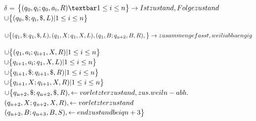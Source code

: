\documentclass[10pt,a4paper]{scrartcl}
\begin{document}
{\begin{enumerate}
$\delta$ =
$\big\{(q\textsubscript{0}, q\textsubscript{i}; q\textsubscript{0}, a\textsubscript{i}, R) \textbar 1 \le i \le n    \big\}         \rightarrow Istzustand, Folgezustand$ \\
$\cup \big\{(q\textsubscript{0}, \$; q\textsubscript{i}, \$, L) | 1 \le i \le n    \big\} $

$\cup \big\{(q\textsubscript{1}, \$; q\textsubscript{1}, \$, L), (q\textsubscript{1}, X; q\textsubscript{1}, X, L), (q\textsubscript{1}, B; q\textsubscript{n+2}, B, R),  \big\} \rightarrow zusammengefasst, weil i abhaengig$

$\cup \big\{(q\textsubscript{1}, a\textsubscript{i}; q\textsubscript{i+1}, X, R) | 1 \le i \le n    \big\}$ \\
$\cup \big\{q\textsubscript{i+1}, a\textsubscript{i};  q\textsubscript{1}, X, L) | 1 \le i \le n    \big\}$ \\
$\cup \big\{q\textsubscript{i+1}, \$;  q\textsubscript{i+1}, \$, R) | 1 \le i \le n    \big\}$ \\
$\cup \big\{q\textsubscript{i+1}, X;  q\textsubscript{i+1}, X, R) | 1 \le i \le n    \big\}$ \\

$\cup \big\{q\textsubscript{n+2}, \$;  q\textsubscript{n+2}, \$, R), \leftarrow vorletzter zustand, zus. weil n-abh.$ \\
$(q\textsubscript{n+2}, X;  q\textsubscript{n+2}, X, R), \leftarrow vorletzter zustand$ \\
$(q\textsubscript{n+2}, B;  q\textsubscript{n+3}, B, S), \leftarrow endzustand bei qn+3 
   \big\}$ \\

\end{enumerate}
}
\end{document}
